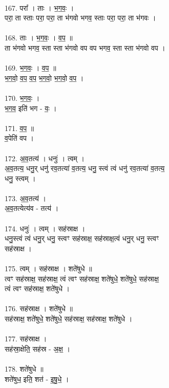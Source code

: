 \\
167. परा᳚ । ताः । भ॒ग॒वः॒ ।\\
परा॒ ता स्ताः परा॒ परा॒ ता भ॑गवो भगव॒ स्ताः परा॒ परा॒ ता भ॑गवः ।\\
\\
168. ताः । भ॒ग॒वः॒ । व॒प॒ ॥\\
ता भ॑गवो भगव॒ स्ता स्ता भ॑गवो वप वप भगव॒ स्ता स्ता भ॑गवो वप ।\\
\\
169. भ॒ग॒वः॒ । व॒प॒ ॥\\
भ॒ग॒वो॒ व॒प॒ व॒प॒ भ॒ग॒वो॒ भ॒ग॒वो॒ व॒प॒ ।\\
\\
170. भ॒ग॒वः॒ ।\\
भ॒ग॒व॒ इति॑ भग - वः॒ ।\\
\\
171. व॒प॒ ॥\\
व॒पेति॑ वप ।\\
\\
172. अ॒व॒तत्य॑ । धनुः॑ । त्वम् ।\\
अ॒व॒तत्य॒ धनु॒र् धनु॑ रव॒तत्या॑ व॒तत्य॒ धनु॒ स्त्वं त्वं धनु॑ रव॒तत्या॑ व॒तत्य॒\\
धनु॒ स्त्वम् ।\\
\\
173. अ॒व॒तत्य॑ ।\\
अ॒व॒तत्येत्य॑व - तत्य॑ ।\\
\\
174. धनुः॑ । त्वम् । सह॑स्राक्ष ।\\
धनु॒स्त्वं त्वं धनु॒र् धनु॒ स्त्वꣳ सह॑स्राक्ष॒ सह॑स्राक्ष॒त्वं धनु॒र् धनु॒ स्त्वꣳ\\
सह॑स्राक्ष ।\\
\\
175. त्वम् । सह॑स्राक्ष । शते॑षुधे ॥\\
त्वꣳ सह॑स्राक्ष॒ सह॑स्राक्ष॒ त्वं त्वꣳ सह॑स्राक्ष॒ शते॑षुधे॒ शते॑षुधे॒ सह॑स्राक्ष॒\\
त्वं त्वꣳ सह॑स्राक्ष॒ शते॑षुधे ।\\
\\
176. सह॑स्राक्ष । शते॑षुधे ॥\\
सह॑स्राक्ष॒ शते॑षुधे॒ शते॑षुधे॒ सह॑स्राक्ष॒ सह॑स्राक्ष॒ शते॑षुधे ।\\
\\
177. सह॑स्राक्ष ।\\
सह॑स्रा॒क्षेति॒ सह॑स्र - अ॒क्ष॒ ।\\
\\
178. शते॑षुधे ॥\\
शते॑षुध॒ इति॒ शत॑ - इ॒षु॒धे॒ ।\\
